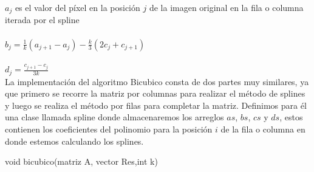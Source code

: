 $a_j$ es el valor del píxel en la posición $j$ de la imagen original en la fila o columna iterada por el spline \\ \\
$b_{j} = \frac{1}{k}(a_{j+1} - a_j) - \frac{k}{3}(2c_j + c_{j+1})$ \\ \\
$d_{j} = \frac{c_{j+1} - c_{j}}{3k} $ \\

La implementación del algoritmo Bicubico consta de dos partes muy similares, ya que primero se recorre la matriz por columnas para realizar el método de splines y luego se realiza el método por filas para completar la matriz.
Definimos para él una clase llamada spline donde almacenaremos los arreglos $as$, $bs$, $cs$ y $ds$, estos contienen los coeficientes del polinomio para la posición $i$ de la fila o columna en donde estemos calculando los splines.

\begin{algorithm}[H]
\begin{algorithmic}[1]\parskip=1mm
\caption{void bicubico(matriz A, vector Res,int k)}
\end{algorithmic}
\end{algorithm}

